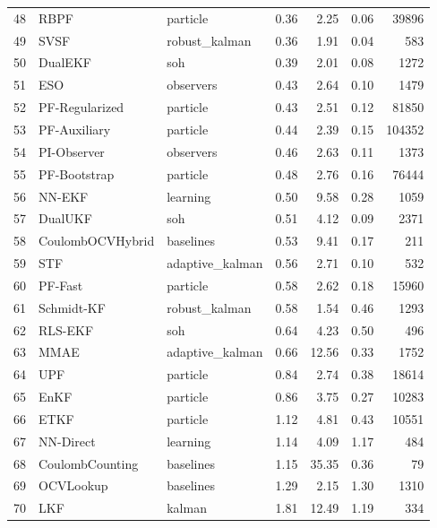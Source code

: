 \begin{longtable}{rllrrrr}
48 & RBPF & particle & 0.36 & 2.25 & 0.06 & 39896 \\
49 & SVSF & robust\_kalman & 0.36 & 1.91 & 0.04 & 583 \\
50 & DualEKF & soh & 0.39 & 2.01 & 0.08 & 1272 \\
51 & ESO & observers & 0.43 & 2.64 & 0.10 & 1479 \\
52 & PF-Regularized & particle & 0.43 & 2.51 & 0.12 & 81850 \\
53 & PF-Auxiliary & particle & 0.44 & 2.39 & 0.15 & 104352 \\
54 & PI-Observer & observers & 0.46 & 2.63 & 0.11 & 1373 \\
55 & PF-Bootstrap & particle & 0.48 & 2.76 & 0.16 & 76444 \\
56 & NN-EKF & learning & 0.50 & 9.58 & 0.28 & 1059 \\
57 & DualUKF & soh & 0.51 & 4.12 & 0.09 & 2371 \\
58 & CoulombOCVHybrid & baselines & 0.53 & 9.41 & 0.17 & 211 \\
59 & STF & adaptive\_kalman & 0.56 & 2.71 & 0.10 & 532 \\
60 & PF-Fast & particle & 0.58 & 2.62 & 0.18 & 15960 \\
61 & Schmidt-KF & robust\_kalman & 0.58 & 1.54 & 0.46 & 1293 \\
62 & RLS-EKF & soh & 0.64 & 4.23 & 0.50 & 496 \\
63 & MMAE & adaptive\_kalman & 0.66 & 12.56 & 0.33 & 1752 \\
64 & UPF & particle & 0.84 & 2.74 & 0.38 & 18614 \\
65 & EnKF & particle & 0.86 & 3.75 & 0.27 & 10283 \\
66 & ETKF & particle & 1.12 & 4.81 & 0.43 & 10551 \\
67 & NN-Direct & learning & 1.14 & 4.09 & 1.17 & 484 \\
68 & CoulombCounting & baselines & 1.15 & 35.35 & 0.36 & 79 \\
69 & OCVLookup & baselines & 1.29 & 2.15 & 1.30 & 1310 \\
70 & LKF & kalman & 1.81 & 12.49 & 1.19 & 334 \\
\bottomrule\end{longtable}\endgroup
